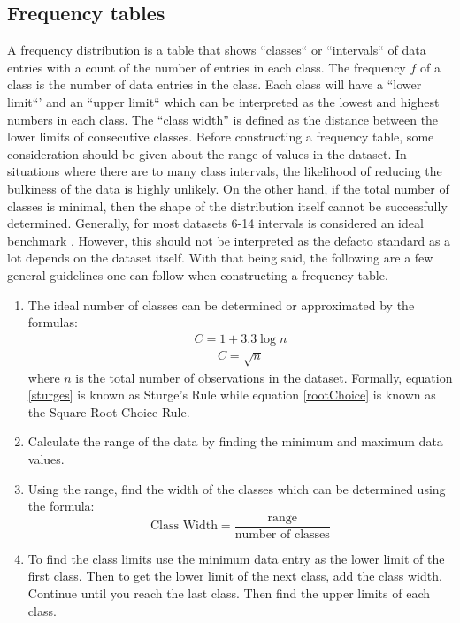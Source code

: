 \subsection{Frequency tables}
A frequency distribution is a table that shows ``classes`` or ``intervals`` of data 
entries with a count of the number of entries in each class. The frequency $f$ of 
a class is the number of data entries in the class. Each class will have a 
``lower limit``' and an ``upper limit`` which can be interpreted as the 
lowest and highest numbers in each class. The “class width” is defined as the 
distance between the lower limits of consecutive classes. Before constructing a 
frequency table, some consideration should be given about the range of values in 
the dataset. In situations where there are to many class intervals, the likelihood 
of reducing the bulkiness of the data is highly unlikely. On the other hand, if 
the total number of classes is minimal, then the shape of the distribution itself 
cannot be successfully determined. Generally, for most datasets 6-14 intervals 
is considered an ideal benchmark \cite{c7}. However, this should not be interpreted as the 
defacto standard as a lot depends on the dataset itself. With that being said, 
the following are a few general guidelines one can follow when constructing a 
frequency table. 

\begin{enumerate}
    \item The ideal number of classes can be determined or approximated by the 
    formulas: 
    \begin{align}
        C = 1 + 3.3\log{n} \label{sturges}
    \end{align}
    \begin{align}
        C = \sqrt{n} \label{rootChoice}
    \end{align}
    where $n$ is the total number of observations in the dataset. Formally, 
    equation \ref{sturges} is known as Sturge's Rule while equation \ref{rootChoice}
    is known as the Square Root Choice Rule. 
    \item Calculate the range of the data by finding the minimum and maximum data 
    values. 
    \item  Using the range, find the width of the classes which can be determined
    using the formula:
    \begin{equation}
        \mbox{Class Width} = \frac{\mbox{range}}{\mbox{number of classes}}
    \end{equation}
    \item To find the class limits use the minimum data entry as the lower limit 
    of the first class. Then to get the lower limit of the next class, add the 
    class width. Continue until you reach the last class. Then find the upper 
    limits of each class.
\end{enumerate}

